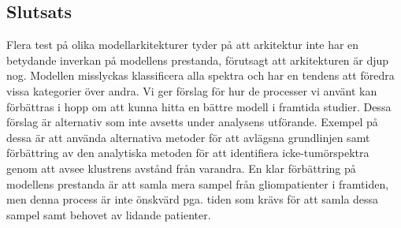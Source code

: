 \subsection*{Slutsats}

Flera test på olika modellarkitekturer tyder på att arkitektur inte har en betydande inverkan på modellens prestanda, förutsagt att arkitekturen är djup nog. Modellen misslyckas klassificera alla spektra och har en tendens att föredra vissa kategorier över andra. Vi ger förslag för hur de processer vi använt kan förbättras i hopp om att kunna hitta en bättre modell i framtida studier. Dessa förslag är alternativ som inte avsetts under analysens utförande. Exempel på dessa är att använda alternativa metoder för att avlägsna grundlinjen samt förbättring av den analytiska metoden för att identifiera icke-tumörspektra genom att avsee klustrens avstånd från varandra. En klar förbättring på modellens prestanda är att samla mera sampel från gliompatienter i framtiden, men denna process är inte önskvärd pga. tiden som krävs för att samla dessa sampel samt behovet av lidande patienter.